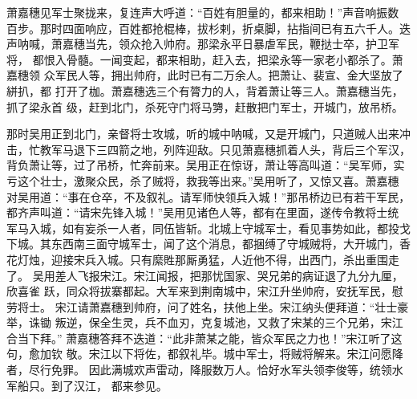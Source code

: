 萧嘉穗见军士聚拢来，复连声大呼道：“百姓有胆量的，都来相助！”声音响振数
百步。那时四面响应，百姓都抢棍棒，拔杉剌，折桌脚，拈指间已有五六千人。迭
声呐喊，萧嘉穗当先，领众抢入帅府。那梁永平日暴虐军民，鞭挞士卒，护卫军将，
都恨入骨髓。一闻变起，都来相助，赶入去，把梁永等一家老小都杀了。萧嘉穗领
众军民人等，拥出帅府，此时已有二万余人。把萧让、裴宣、金大坚放了絣扒，都
打开了枷。萧嘉穗选三个有膂力的人，背着萧让等三人。萧嘉穗当先，抓了梁永首
级，赶到北门，杀死守门将马勥，赶散把门军士，开城门，放吊桥。

那时吴用正到北门，亲督将士攻城，听的城中呐喊，又是开城门，只道贼人出来冲
击，忙教军马退下三四箭之地，列阵迎敌。只见萧嘉穗抓着人头，背后三个军汉，
背负萧让等，过了吊桥，忙奔前来。吴用正在惊讶，萧让等高叫道：“吴军师，实
亏这个壮士，激聚众民，杀了贼将，救我等出来。”吴用听了，又惊又喜。萧嘉穗
对吴用道：“事在仓卒，不及叙礼。请军师快领兵入城！”那吊桥边已有若干军民，
都齐声叫道：“请宋先锋入城！”吴用见诸色人等，都有在里面，遂传令教将士统
军马入城，如有妄杀一人者，同伍皆斩。北城上守城军士，看见事势如此，都投戈
下城。其东西南三面守城军士，闻了这个消息，都捆缚了守城贼将，大开城门，香
花灯烛，迎接宋兵入城。只有縻貹那厮勇猛，人近他不得，出西门，杀出重围走了。
吴用差人飞报宋江。宋江闻报，把那忧国家、哭兄弟的病证退了九分九厘，欣喜雀
跃，同众将拔寨都起。大军来到荆南城中，宋江升坐帅府，安抚军民，慰劳将士。
宋江请萧嘉穗到帅府，问了姓名，扶他上坐。宋江纳头便拜道：“壮士豪举，诛锄
叛逆，保全生灵，兵不血刃，克复城池，又救了宋某的三个兄弟，宋江合当下拜。”
萧嘉穗答拜不迭道：“此非萧某之能，皆众军民之力也！”宋江听了这句，愈加钦
敬。宋江以下将佐，都叙礼毕。城中军士，将贼将解来。宋江问愿降者，尽行免罪。
因此满城欢声雷动，降服数万人。恰好水军头领李俊等，统领水军船只。到了汉江，
都来参见。

